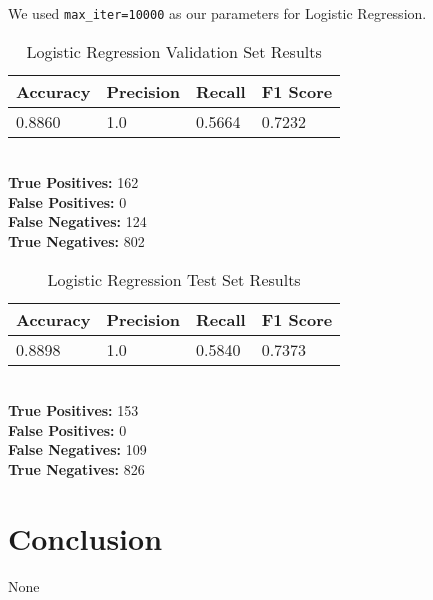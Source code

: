 \documentclass[conference]{IEEEtran}
\begin{document}
We used \verb|max_iter=10000| as our parameters for Logistic Regression.

\begin{table}[H]
    \caption{Logistic Regression Validation Set Results}

    \begin{tabularx}{\linewidth}{|X|X|X|X|}
        \hline
        \textbf{Accuracy} & \textbf{Precision} & \textbf{Recall} & \textbf{F1 Score} \\
        \hline
        0.8860 & 1.0 & 0.5664 & 0.7232 \\
        \hline
    \end{tabularx}\\

    \textbf{True Positives:} 162\\
    \textbf{False Positives:} 0\\
    \textbf{False Negatives:} 124\\
    \textbf{True Negatives:} 802
    \label{tab:lr1}
\end{table}

\begin{table}[H]
    \caption{Logistic Regression Test Set Results}

    \begin{tabularx}{\linewidth}{|X|X|X|X|}
        \hline
        \textbf{Accuracy} & \textbf{Precision} & \textbf{Recall} & \textbf{F1 Score} \\
        \hline
        0.8898 & 1.0 & 0.5840 & 0.7373 \\
        \hline
    \end{tabularx}\\

    \textbf{True Positives:} 153\\
    \textbf{False Positives:} 0\\
    \textbf{False Negatives:} 109\\
    \textbf{True Negatives:} 826
    \label{tab:lr2}
\end{table}

\section{Conclusion}

\begin{thebibliography}{00}
 None
\end{thebibliography}
\end{document}

